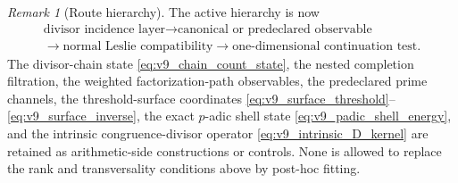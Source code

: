 \documentclass[11pt]{amsart}
\numberwithin{equation}{section}
\theoremstyle{plain}
\theoremstyle{definition}
\theoremstyle{remark}
\newtheorem{remark}[theorem]{Remark}
\begin{document}
\begin{remark}[Route hierarchy]
\label{rem:v9_route_hierarchy}
The active hierarchy is now
\[
\begin{gathered}
\text{divisor incidence layer}
\longrightarrow
\text{canonical or predeclared observable}\\
\longrightarrow
\text{normal Leslie compatibility}
\longrightarrow
\text{one-dimensional continuation test}.
\end{gathered}
\]
The divisor-chain state \eqref{eq:v9_chain_count_state}, the nested completion filtration, the
weighted factorization-path observables, the predeclared prime channels, the threshold-surface
coordinates \eqref{eq:v9_surface_threshold}--\eqref{eq:v9_surface_inverse}, the exact
$p$-adic shell state \eqref{eq:v9_padic_shell_energy}, and the intrinsic
congruence-divisor operator \eqref{eq:v9_intrinsic_D_kernel} are retained as
arithmetic-side constructions or controls.  None is allowed to replace the rank and
transversality conditions above by post-hoc fitting.
\end{remark}
\end{document}

